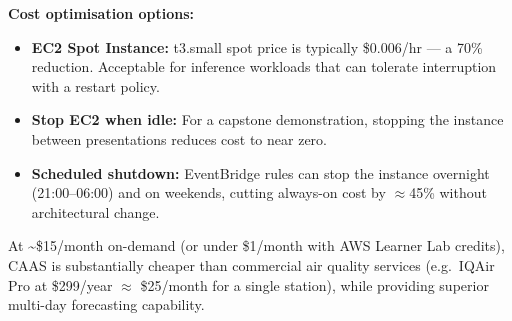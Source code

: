 \textbf{Cost optimisation options:}
\begin{itemize}
    \item \textbf{EC2 Spot Instance:} t3.small spot price is typically \$0.006/hr
          --- a 70\% reduction. Acceptable for inference workloads that can tolerate
          interruption with a restart policy.
    \item \textbf{Stop EC2 when idle:} For a capstone demonstration, stopping the
          instance between presentations reduces cost to near zero.
    \item \textbf{Scheduled shutdown:} EventBridge rules can stop the instance
          overnight (21:00--06:00) and on weekends, cutting always-on cost by
          $\approx$45\% without architectural change.
\end{itemize}

At \textasciitilde\$15/month on-demand (or under \$1/month with AWS Learner Lab
credits), CAAS is substantially cheaper than commercial air quality services
(e.g.\ IQAir Pro at \$299/year $\approx$ \$25/month for a single station),
while providing superior multi-day forecasting capability.
